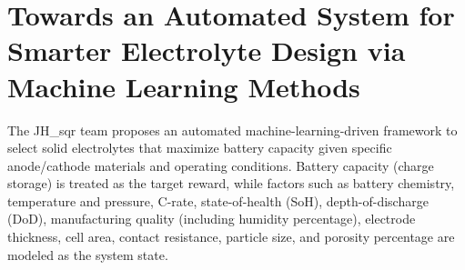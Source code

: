 






\section{Towards an Automated System for Smarter Electrolyte Design via Machine Learning Methods}


The JH\_sqr team proposes an automated machine-learning-driven framework to select solid electrolytes that maximize battery capacity given specific anode/cathode materials and operating conditions. Battery capacity (charge storage) is treated as the target reward, while factors such as battery chemistry, temperature and pressure, C-rate, state-of-health (SoH), depth-of-discharge (DoD), manufacturing quality (including humidity percentage), electrode thickness, cell area, contact resistance, particle size, and porosity percentage are modeled as the system state.


